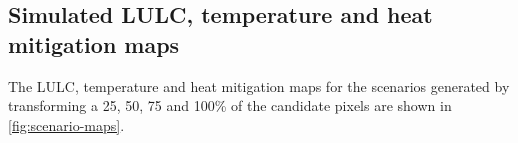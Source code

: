 \documentclass[10pt,letterpaper]{article}
\begin{document}
\subsection*{Simulated LULC, temperature and heat mitigation maps}

The LULC, temperature and heat mitigation maps for the scenarios generated by transforming a 25, 50, 75 and 100\% of the candidate pixels are shown in \autoref{fig:scenario-maps}.
\end{document}
